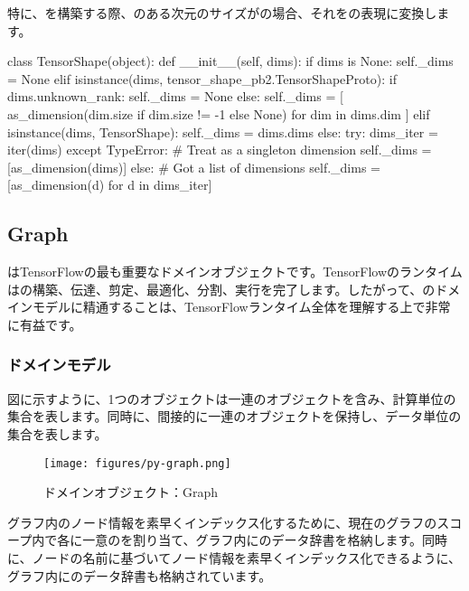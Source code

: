 \begin{content}
特に、を構築する際、のある次元のサイズがの場合、それをの表現に変換します。

\begin{leftbar}
\begin{python}
class TensorShape(object):
  def __init__(self, dims):
    if dims is None:
      self._dims = None
    elif isinstance(dims, tensor_shape_pb2.TensorShapeProto):
      if dims.unknown_rank:
        self._dims = None
      else:
        self._dims = [
          as_dimension(dim.size if dim.size != -1 else None)
          for dim in dims.dim
        ]
    elif isinstance(dims, TensorShape):
      self._dims = dims.dims
    else:
      try:
        dims_iter = iter(dims)
      except TypeError:
        # Treat as a singleton dimension
        self._dims = [as_dimension(dims)]
      else:
        # Got a list of dimensions
        self._dims = [as_dimension(d) for d in dims_iter]
\end{python}
\end{leftbar}

\subsection{Graph}

はTensorFlowの最も重要なドメインオブジェクトです。TensorFlowのランタイムはの構築、伝達、剪定、最適化、分割、実行を完了します。したがって、のドメインモデルに精通することは、TensorFlowランタイム全体を理解する上で非常に有益です。

\subsubsection{ドメインモデル}

図に示すように、1つのオブジェクトは一連のオブジェクトを含み、計算単位の集合を表します。同時に、間接的に一連のオブジェクトを保持し、データ単位の集合を表します。

\begin{figure}[H]
\centering
\texttt{[image: figures/py-graph.png]}
\caption{ドメインオブジェクト：Graph}
 \label{fig:py-graph}
\end{figure}

グラフ内のノード情報を素早くインデックス化するために、現在のグラフのスコープ内で各に一意のを割り当て、グラフ内にのデータ辞書を格納します。同時に、ノードの名前に基づいてノード情報を素早くインデックス化できるように、グラフ内にのデータ辞書も格納されています。


\end{content}

